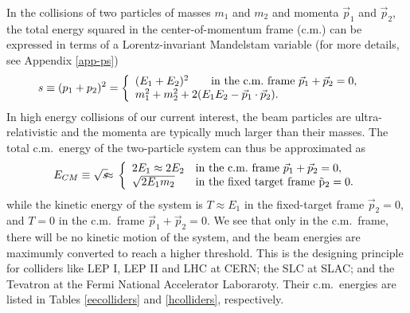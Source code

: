 \documentclass[12pt,prd,aps,floats,preprintnumbers,preprint,superscriptaddress,floatfix,nofootinbib]{revtex4}
\def\vp{{\vec p}}
\def\ecm{E_{CM}}
\def\bea{\begin{eqnarray}}
\def\eea{\end{eqnarray}}
\begin{document}
In the collisions of two particles of masses $m_1$ and $m_2$
and momenta $\vp_1$ and $\vp_2$, the total energy squared in the
center-of-momentum frame (c.m.)  can be expressed in terms of a  
Lorentz-invariant Mandelstam variable (for more details, see
Appendix \ref{app-ps})
%
\bea
\nonumber
s  \equiv  (p_1+p_2)^2 = \left\{  
\begin{array}{ll}
(E_1 + E_2 )^2 \qquad   {\rm  in\  the\  c.m.\ frame}\ \vp_1+\vp_2=0, & \\
  m_1^2 + m_2^2 + 2(E_1E_2-\vp_1\cdot \vp_2). &  
\end{array}
\right.
\eea
%
In high energy collisions of our current interest, the beam particles are ultra-relativistic
and the momenta are typically much larger than their masses.
The total c.m.~energy of the two-particle system can thus be approximated as 
\bea
\nonumber
\ecm \equiv \sqrt s \hskip-0.2cm & \approx &\hskip-0.2cm  
\left\{  
\begin{array}{ll}
2E_1 \approx 2 E_2   &   {\rm  in\ the\ c.m.\ frame}\ \vp_1+\vp_2=0, \\
\sqrt{2 E_1 m_2} &   {\rm in\ the\ fixed\ target\  frame\ \vp_2=0}. 
\end{array}
\right.
\eea
while the kinetic energy of the system is
$T \approx  E_1$ in  the  fixed-target  frame $\vp_2=0$, 
and $T = 0$  in the  c.m.~frame $\vp_1+\vp_2=0.$
%
We see that only in the c.m.~frame, there will be no kinetic motion of
the system, and  the beam energies are maximumly 
converted to reach a higher threshold. This is the designing 
principle for colliders like LEP I,  LEP II and LHC at CERN; the SLC at 
SLAC; and the Tevatron at the Fermi National Accelerator Laboraroty. 
Their c.m.~energies are listed in Tables \ref{eecolliders} 
and \ref{hcolliders}, respectively. 
\end{document}
